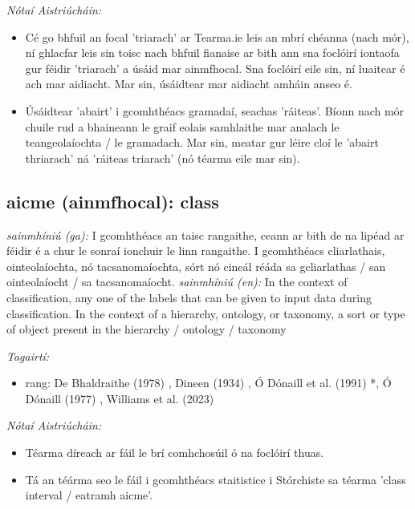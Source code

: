 \documentclass{article}
\begin{document}
 \noindent \textit{Nótaí Aistriúcháin:}
\begin{itemize}
	\item Cé go bhfuil an focal 'triarach' ar Tearma.ie leis an mbrí chéanna (nach mór), ní ghlacfar leis sin toisc nach bhfuil fianaise ar bith ann sna foclóirí iontaofa gur féidir 'triarach' a úsáid mar ainmfhocal. Sna foclóirí eile sin, ní luaitear é ach mar aidiacht. Mar sin, úsáidtear mar aidiacht amháin anseo é.
	\item Úsáidtear 'abairt' i gcomhthéacs gramadaí, seachas 'ráiteas'. Bíonn nach mór chuile rud a bhaineann le graif eolais samhlaithe mar analach le teangeolaíochta / le gramadach. Mar sin, meatar gur léire cloí le 'abairt thriarach' ná 'ráiteas triarach' (nó téarma eile mar sin).
\end{itemize}


\subsection*{aicme (ainmfhocal): class} 
 \noindent \textit{sainmhíniú (ga):} I gcomhthéacs an taisc rangaithe, ceann ar bith de na lipéad ar féidir é a chur le sonraí ionchuir le linn rangaithe. I gcomhthéacs cliarlathais, ointeolaíochta, nó tacsanomaíochta, sórt nó cineál réáda sa gcliarlathas / san ointeolaíocht / sa tacsanomaíocht.
\newline\newline
 \noindent \textit{sainmhíniú (en):} In the context of classification, any one of the labels that can be given to input data during classification. In the context of a hierarchy, ontology, or taxonomy, a sort or type of object present in the hierarchy / ontology / taxonomy
\newline

 \noindent \textit{Tagairtí:}
\begin{itemize}
	\item rang: De Bhaldraithe (1978) \cite{de-bhaldraithe}, Dineen (1934) \cite{dineen}, Ó Dónaill et al. (1991) \cite{focloir-beag}*, Ó Dónaill (1977) \cite{odonaill}, Williams et al. (2023) \cite{storchiste}
\end{itemize}

 \noindent \textit{Nótaí Aistriúcháin:}
\begin{itemize}
	\item Téarma díreach ar fáil le brí comhchosúil ó na foclóirí thuas.
	\item Tá an téárma seo le fáil i gcomhthéacs staitistice i Stórchiste sa téarma 'class interval / eatramh aicme'.
\end{itemize}
\end{document}
